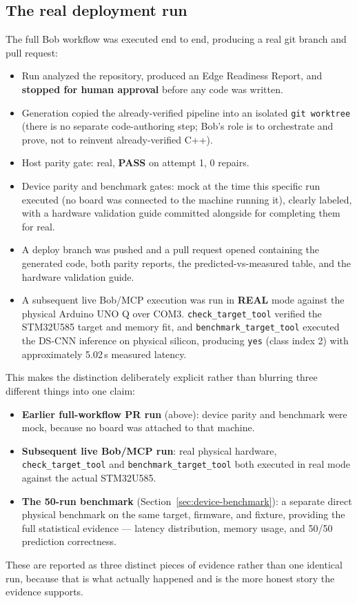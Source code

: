 \documentclass[11pt,a4paper]{article}
\begin{document}
\subsection{The real deployment run}
\label{sec:run}
The full Bob workflow was executed end to end, producing a real git branch
and pull request:
\begin{itemize}[leftmargin=1.4em]
  \item Run analyzed the repository, produced an Edge Readiness Report, and
  \textbf{stopped for human approval} before any code was written.
  \item Generation copied the already-verified pipeline into an isolated
  \texttt{git worktree} (there is no separate code-authoring step; Bob's
  role is to orchestrate and prove, not to reinvent already-verified C++).
  \item Host parity gate: real, \textbf{PASS} on attempt 1, 0 repairs.
  \item Device parity and benchmark gates: mock at the time this specific
  run executed (no board was connected to the machine running it), clearly
  labeled, with a hardware validation guide committed alongside for
  completing them for real.
  \item A deploy branch was pushed and a pull request opened containing the
  generated code, both parity reports, the predicted-vs-measured table, and
  the hardware validation guide.
  \item A subsequent live Bob/MCP execution was run in \textbf{REAL} mode
  against the physical Arduino UNO Q over COM3. \texttt{check\_target\_tool}
  verified the STM32U585 target and memory fit, and
  \texttt{benchmark\_target\_tool} executed the DS-CNN inference on
  physical silicon, producing \texttt{yes} (class index 2) with
  approximately 5.02\,s measured latency.
\end{itemize}

This makes the distinction deliberately explicit rather than blurring three
different things into one claim:
\begin{itemize}[leftmargin=1.4em]
  \item \textbf{Earlier full-workflow PR run} (above): device parity and
  benchmark were mock, because no board was attached to that machine.
  \item \textbf{Subsequent live Bob/MCP run}: real physical hardware,
  \texttt{check\_target\_tool} and \texttt{benchmark\_target\_tool} both
  executed in real mode against the actual STM32U585.
  \item \textbf{The 50-run benchmark} (Section~\ref{sec:device-benchmark}):
  a separate direct physical benchmark on the same target, firmware, and
  fixture, providing the full statistical evidence --- latency
  distribution, memory usage, and 50/50 prediction correctness.
\end{itemize}
These are reported as three distinct pieces of evidence rather than one
identical run, because that is what actually happened and is the more
honest story the evidence supports.
\end{document}
